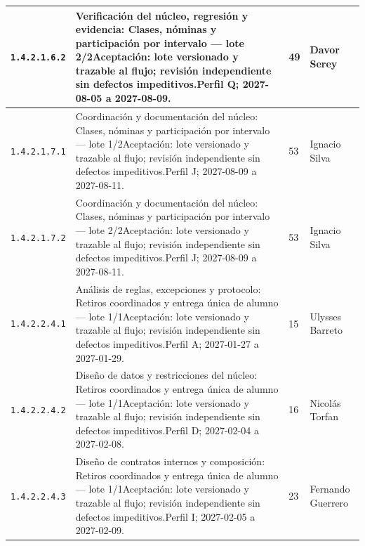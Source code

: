 \begin{longtable}{L{29mm}L{80mm}R{12mm}L{28mm}}
\texttt{1.\allowbreak{}4.\allowbreak{}2.\allowbreak{}1.\allowbreak{}6.\allowbreak{}2} & Verificación del núcleo, regresión y evidencia: Clases, nóminas y participación por intervalo — lote 2/2\newline Aceptación: lote versionado y trazable al flujo; revisión independiente sin defectos impeditivos.\newline Perfil Q; 2027-08-05 a 2027-08-09. & 49 & Davor Serey\\\hline
\texttt{1.\allowbreak{}4.\allowbreak{}2.\allowbreak{}1.\allowbreak{}7.\allowbreak{}1} & Coordinación y documentación del núcleo: Clases, nóminas y participación por intervalo — lote 1/2\newline Aceptación: lote versionado y trazable al flujo; revisión independiente sin defectos impeditivos.\newline Perfil J; 2027-08-09 a 2027-08-11. & 53 & Ignacio Silva\\\hline
\texttt{1.\allowbreak{}4.\allowbreak{}2.\allowbreak{}1.\allowbreak{}7.\allowbreak{}2} & Coordinación y documentación del núcleo: Clases, nóminas y participación por intervalo — lote 2/2\newline Aceptación: lote versionado y trazable al flujo; revisión independiente sin defectos impeditivos.\newline Perfil J; 2027-08-09 a 2027-08-11. & 53 & Ignacio Silva\\\hline
\texttt{1.\allowbreak{}4.\allowbreak{}2.\allowbreak{}2.\allowbreak{}4.\allowbreak{}1} & Análisis de reglas, excepciones y protocolo: Retiros coordinados y entrega única de alumno — lote 1/1\newline Aceptación: lote versionado y trazable al flujo; revisión independiente sin defectos impeditivos.\newline Perfil A; 2027-01-27 a 2027-01-29. & 15 & Ulysses Barreto\\\hline
\texttt{1.\allowbreak{}4.\allowbreak{}2.\allowbreak{}2.\allowbreak{}4.\allowbreak{}2} & Diseño de datos y restricciones del núcleo: Retiros coordinados y entrega única de alumno — lote 1/1\newline Aceptación: lote versionado y trazable al flujo; revisión independiente sin defectos impeditivos.\newline Perfil D; 2027-02-04 a 2027-02-08. & 16 & Nicolás Torfan\\\hline
\texttt{1.\allowbreak{}4.\allowbreak{}2.\allowbreak{}2.\allowbreak{}4.\allowbreak{}3} & Diseño de contratos internos y composición: Retiros coordinados y entrega única de alumno — lote 1/1\newline Aceptación: lote versionado y trazable al flujo; revisión independiente sin defectos impeditivos.\newline Perfil I; 2027-02-05 a 2027-02-09. & 23 & Fernando Guerrero\\\hline

\end{longtable}
